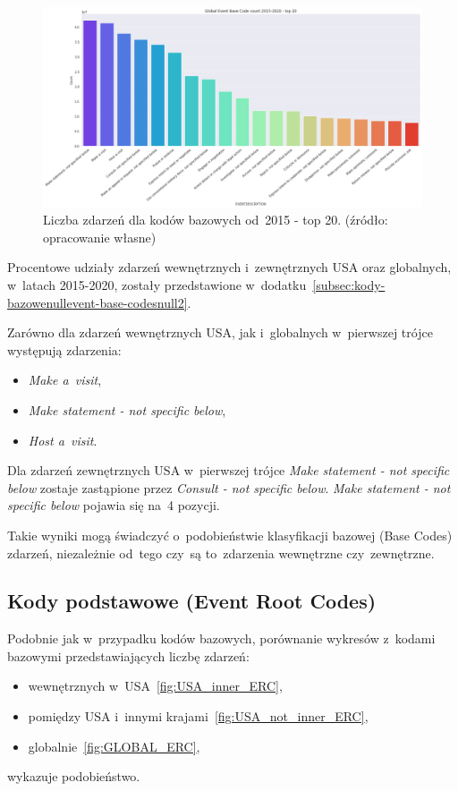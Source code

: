 \documentclass[11pt]{report}
\begin{document}
    \begin{figure}[tp]
        \centering
        \includegraphics[width=\linewidth]{fig/GLOBAL//EBC.png}
        \caption{Liczba zdarzeń dla kodów bazowych od~2015 - top 20. (źródło: opracowanie własne)}
        \label{fig:GLOBAL_EBC}
    \end{figure}

    Procentowe udziały zdarzeń wewnętrznych i~zewnętrznych USA oraz globalnych, w~latach 2015-2020, zostały przedstawione
    w~dodatku~\ref{subsec:kody-bazowenullevent-base-codesnull2}.

    Zarówno dla zdarzeń wewnętrznych USA, jak i~globalnych w~pierwszej trójce występują zdarzenia:
    \begin{itemize}
        \item \textit{Make a~visit},
        \item \textit{Make statement - not specific below},
        \item \textit{Host a~visit}.
    \end{itemize}
    Dla zdarzeń zewnętrznych USA w~pierwszej trójce \textit{Make statement - not specific below} zostaje zastąpione przez \textit{Consult - not specific below}.
    \textit{Make statement - not specific below} pojawia się na~4 pozycji.

    Takie wyniki mogą świadczyć o~podobieństwie klasyfikacji bazowej (Base Codes) zdarzeń,
    niezależnie od~tego czy~są to~zdarzenia wewnętrzne czy~zewnętrzne.

    \subsection{Kody podstawowe (Event Root Codes)}\label{subsec:kody-podstawowenullevent-root-codesnull}

    Podobnie jak w~przypadku kodów bazowych, porównanie wykresów z~kodami bazowymi przedstawiających liczbę zdarzeń:
    \begin{itemize}
        \item wewnętrznych w~USA~\ref{fig:USA_inner_ERC},
        \item pomiędzy USA i~innymi krajami~\ref{fig:USA_not_inner_ERC},
        \item globalnie~\ref{fig:GLOBAL_ERC},
    \end{itemize}
    wykazuje podobieństwo.
\end{document}
